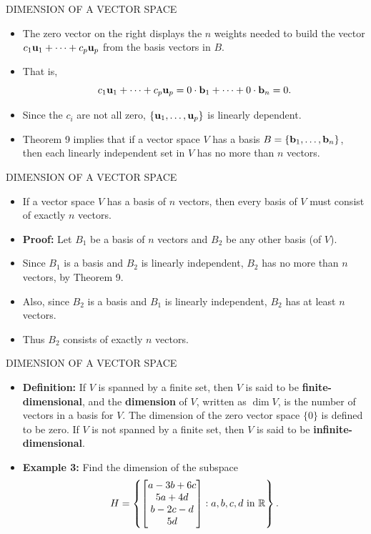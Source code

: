 \begin{frame}[shrink=8]{DIMENSION OF A VECTOR SPACE}
\begin{itemize}
\item The zero vector on the right displays the $n$ weights needed to build the vector $c_1\mathbf{u}_1+\cdots+c_p\mathbf{u}_p$ from the basis vectors in $B$.
\item That is,
\[
c_1\mathbf{u}_1+\cdots+c_p\mathbf{u}_p=0\cdot\mathbf{b}_1+\cdots+0\cdot\mathbf{b}_n=0.
\]
\item Since the $c_i$ are not all zero, $\{\mathbf{u}_1,\ldots,\mathbf{u}_p\}$ is linearly dependent.
\item Theorem 9 implies that if a vector space $V$ has a basis $B=\{\mathbf{b}_1,\ldots,\mathbf{b}_n\}$, then each linearly independent set in $V$ has no more than $n$ vectors.
\end{itemize}
\end{frame}

\begin{frame}[shrink=7]{DIMENSION OF A VECTOR SPACE}
\begin{itemize}
\item {} If a vector space $V$ has a basis of $n$ vectors, then every basis of $V$ must consist of exactly $n$ vectors.
\item \textbf{Proof:} Let $B_1$ be a basis of $n$ vectors and $B_2$ be any other basis (of $V$).
\item Since $B_1$ is a basis and $B_2$ is linearly independent, $B_2$ has no more than $n$ vectors, by Theorem 9.
\item Also, since $B_2$ is a basis and $B_1$ is linearly independent, $B_2$ has at least $n$ vectors.
\item Thus $B_2$ consists of exactly $n$ vectors.
\end{itemize}
\end{frame}

\begin{frame}[shrink=12]{DIMENSION OF A VECTOR SPACE}
\begin{itemize}
\item \textbf{Definition:} If $V$ is spanned by a finite set, then $V$ is said to be \textbf{finite-dimensional}, and the \textbf{dimension} of $V$, written as $\dim V$, is the number of vectors in a basis for $V$. The dimension of the zero vector space $\{0\}$ is defined to be zero. If $V$ is not spanned by a finite set, then $V$ is said to be \textbf{infinite-dimensional}.
\item \textbf{Example 3:} Find the dimension of the subspace
\[
H=\left\{\begin{bmatrix}
a-3b+6c\\
5a+4d\\
b-2c-d\\
5d
\end{bmatrix}:a,b,c,d\text{ in }\mathbb{R}\right\}.
\]
\end{itemize}
\end{frame}

